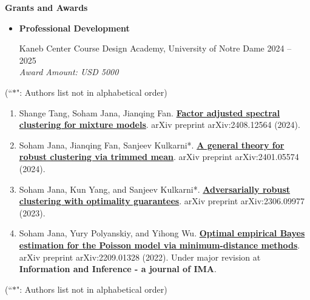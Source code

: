 \documentclass[letterpaper,12pt,oneside]{article}
\theoremstyle{definition}
\begin{document}
			\noindent \textbf{Grants and Awards}
			
			\begin{itemize}
				\item[]  \textbf{Professional Development}
				
				Kaneb Center Course Design Academy, University of Notre Dame \hfill
				2024 -- 2025\\
				{\it Award Amount: USD 5000}
			\end{itemize}
			
			
			 (``$\ast$": Authors list not in alphabetical order)
			
			\begin{enumerate}
				
				\item Shange Tang, Soham Jana, Jianqing Fan. \href{https://www.arxiv.org/abs/2408.12564}{\bf Factor adjusted spectral clustering for mixture models}. arXiv preprint arXiv:2408.12564 (2024).
				
				
				\item Soham Jana, Jianqing Fan, Sanjeev Kulkarni*. \href{https://arxiv.org/abs/2401.05574}{\bf A general theory for robust clustering via trimmed mean}. arXiv preprint arXiv:2401.05574 (2024).
				
				\item Soham Jana, Kun Yang, and Sanjeev Kulkarni*. \href{https://arxiv.org/abs/2306.09977}{\bf Adversarially robust clustering with optimality guarantees}. arXiv preprint arXiv:2306.09977 (2023).
				
				\item Soham Jana, Yury Polyanskiy, and Yihong Wu. \href{https://arxiv.org/abs/2209.01328}{\bf Optimal empirical Bayes estimation for the Poisson model via minimum-distance methods}. arXiv preprint arXiv:2209.01328 (2022). Under major revision at \textbf{Information and Inference - a journal of IMA}.
				
				
			\end{enumerate}
			
			 (``$\ast$": Authors list not in alphabetical order)
			
\end{document}
